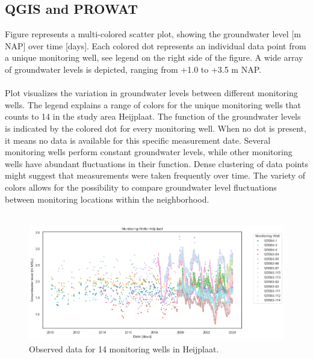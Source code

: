 \subsection{QGIS and PROWAT}
Figure  represents a multi-colored scatter plot, showing the groundwater level [m NAP] over time [days]. Each colored dot represents an individual data point from a unique monitoring well, see legend on the right side of the figure. A wide array of groundwater levels is depicted, ranging from +1.0 to +3.5 m NAP. \\
\\
Plot  visualizes the variation in groundwater levels between different monitoring wells. The legend explains a range of colors for the unique monitoring wells that counts to 14 in the study area Heijplaat. The function of the groundwater levels is indicated by the colored dot for every monitoring well. When no dot is present, it means no data is available for this specific measurement date. Several monitoring wells perform constant groundwater levels, while other monitoring wells have abundant fluctuations in their function. Dense clustering of data points might suggest that measurements were taken frequently over time. The variety of colors allows for the possibility to compare groundwater level fluctuations between monitoring locations within the neighborhood. \\
\\
\begin{figure}[htbp]
    \centering
    \includegraphics[width=0.75\linewidth]{frontmatter/Heijplaat-fig/heijoverzicht.png}
    \caption{Observed data for 14 monitoring wells in Heijplaat.}
    \label{summheij}
\end{figure}\\

